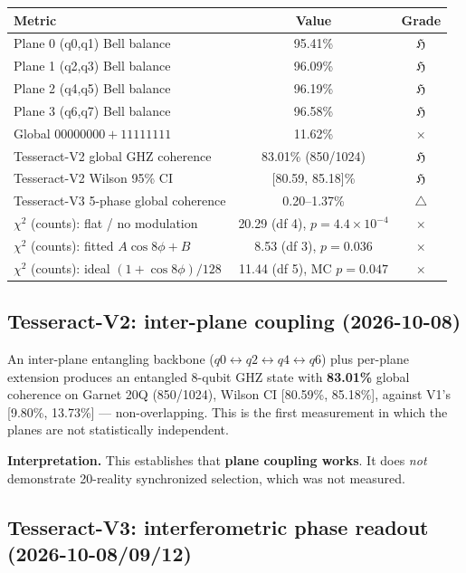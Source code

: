 \documentclass[11pt,a4paper]{article}
\begin{document}
\begin{table}[h]
\centering
\begin{tabular}{lcc}
\toprule
Metric & Value & Grade \\
\midrule
Plane 0 (q0,q1) Bell balance & 95.41\% & $\mathfrak{H}$ \\
Plane 1 (q2,q3) Bell balance & 96.09\% & $\mathfrak{H}$ \\
Plane 2 (q4,q5) Bell balance & 96.19\% & $\mathfrak{H}$ \\
Plane 3 (q6,q7) Bell balance & 96.58\% & $\mathfrak{H}$ \\
Global $00000000 + 11111111$ & 11.62\% & $\times$ \\
\midrule
Tesseract-V2 global GHZ coherence & 83.01\% (850/1024) & $\mathfrak{H}$ \\
Tesseract-V2 Wilson 95\% CI & [80.59, 85.18]\% & $\mathfrak{H}$ \\
Tesseract-V3 5-phase global coherence & 0.20--1.37\% & $\triangle$ \\
$\chi^2$ (counts): flat / no modulation & 20.29 (df 4), $p=4.4\times10^{-4}$ & $\times$ \\
$\chi^2$ (counts): fitted $A\cos 8\phi+B$ & 8.53 (df 3), $p=0.036$ & $\times$ \\
$\chi^2$ (counts): ideal $(1+\cos 8\phi)/128$ & 11.44 (df 5), MC $p=0.047$ & $\times$ \\
\bottomrule
\end{tabular}
\end{table}

\subsection{Tesseract-V2: inter-plane coupling (2026-10-08)}

An inter-plane entangling backbone ($q0\!\leftrightarrow\!q2\!\leftrightarrow\!q4\!\leftrightarrow\!q6$)
plus per-plane extension produces an entangled 8-qubit GHZ state with
\textbf{83.01\%} global coherence on Garnet 20Q (850/1024), Wilson CI
[80.59\%, 85.18\%], against V1's [9.80\%, 13.73\%] --- non-overlapping. This is
the first measurement in which the planes are not statistically independent.

\textbf{Interpretation.} This establishes that \textbf{plane coupling works}. It
does \emph{not} demonstrate 20-reality synchronized selection, which was not
measured.

\subsection{Tesseract-V3: interferometric phase readout (2026-10-08/09/12)}
\end{document}
